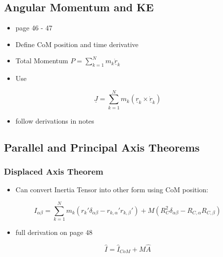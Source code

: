 \documentclass[a4paper,11pt,normalem]{article}
\begin{document}
\section{}\label{lecture-17}

\subsection{Angular Momentum and KE}\label{angular-momentum-and-ke}

\begin{itemize}
\item
  page 46 - 47
\item
  Define CoM position and time derivative
\item
  Total Momentum \(P = \sum_{k = 1}^N m_k\underline{\dot{r}}_k\)
\item
  Use
\end{itemize}

\[
    \underline{J} = \sum_{k = 1}^N m_k(\underline{r}_k \times \underline{\dot{r}}_k)
\]

\begin{itemize}
\item
  follow derivations in notes
\end{itemize}

\subsection{Parallel and Principal Axis Theorems}\label{parallel-and-principal-axis-theorems}

\subsubsection{Displaced Axis Theorem}\label{displaced-axis-theorem}

\begin{itemize}
\item
  Can convert Inertia Tensor into other form using CoM position:
\end{itemize}

\[
    I_{\alpha\beta} = \sum_{k = 1}^N m_k(r_{k}'\delta_{\alpha\beta} - r_{k,\alpha}'r_{k,\beta}') + M(R_C^2\delta_{\alpha\beta} - R_{C,\alpha}R_{C,\beta})
\]

\begin{itemize}
\item
  full derivation on page 48
\end{itemize}

\[
    \hat{I} = \hat{I}_{CoM} + M\hat{A}
\]
\end{document}
